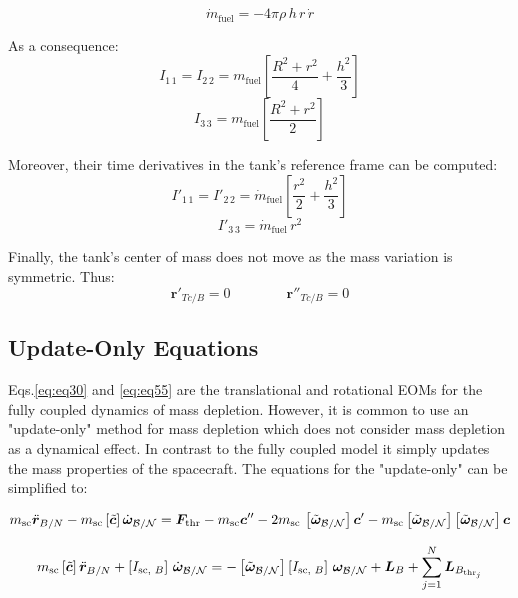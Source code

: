 \begin{equation}
	\dot{m}_\text{fuel} = - 4\pi\rho\,h\,r\,\dot{r}
\end{equation}

As a consequence:
\begin{equation}
	I_{1\,1} = I_{2\,2} = m_\text{fuel}\left[\frac{R^2+ r^2}{4} +\frac{h^2}{3}\right]
\end{equation}
\begin{equation}
	I_{3\,3} = m_\text{fuel}\left[\frac{R^2+ r^2}{2} \right]
\end{equation}

Moreover, their time derivatives in the tank's reference frame can be computed:
\begin{equation}
	I'_{1\,1} = I'_{2\,2} = \dot{m}_\text{fuel}\left[\frac{r^2}{2}+\frac{h^2}{3}\right]
\end{equation}
\begin{equation}
	I'_{3\,3}  = \dot{m}_\text{fuel}\,r^2
\end{equation}

Finally, the tank's center of mass does not move as the mass variation is symmetric. Thus:
\begin{equation}
	\bm{r}'_{Tc/B} = 0 \qquad\qquad \bm{r}''_{Tc/B}=0
\end{equation}

\subsection{Update-Only Equations}

Eqs.\eqref{eq:eq30} and \eqref{eq:eq55} are the translational and rotational EOMs for the fully coupled dynamics of mass depletion. However, it is common to use an "update-only" method for mass depletion which does not consider mass depletion as a dynamical effect. In contrast to the fully coupled model it simply updates the mass properties of the spacecraft. The equations for the "update-only" can be simplified to:

\begin{equation}\label{eq:eq31}
m_{\text{sc}} \ddot{\bm{r}}_{B/N} - m_{\text{sc}} \left[\tilde{\bm{c}}\right]\dot{\bm{\omega}}_{\cal{B}/\cal{N}} =  \bm{F}_{\text{thr}} - m_{\text{sc}} \bm{c}''-2 m_{\text{sc}} \,\left[\tilde{\bm{\omega}}_{\cal{B}/\cal{N}}\right]
\bm{c}' - m_{\text{sc}} \left[\tilde{\bm{\omega}}_{\cal{B}/\cal{N}}\right] \left[\tilde{\bm{\omega}}_{\cal{B}/\cal{N}}\right] \bm{c} 
\end{equation}

\begin{equation}\label{eq:eq55}
m_{\text{sc}} \left[\tilde{\bm{c}}\right]\ddot{\bm{r}}_{B/N} + \left[I_{\text{sc, }B}\right]\,\dot{\bm{\omega}}_{\cal{B}/\cal{N}} = - \left[\tilde{\bm{\omega}}_{\cal{B}/\cal{N}}\right]\left[I_{\text{sc, }B}\right]\,\bm{\omega}_{\cal{B}/\cal{N}}
+ \bm{L}_{B} + \sum_{j=1}^{N}\bm{L}_{B_{\text{thr}_j}} 
\end{equation}



